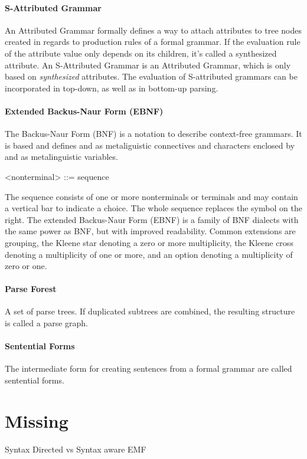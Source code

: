 \paragraph{S-Attributed Grammar} 
An Attributed Grammar formally defines a way to attach attributes to tree nodes created in regards to production rules of a formal grammar. If  the evaluation rule of the attribute value only depends on its children, it's called a synthesized attribute. An S-Attributed Grammar is an Attributed Grammar, which is only based on \emph{synthesized} attributes. The evaluation of S-attributed grammars can be incorporated in top-down, as well as in bottom-up parsing. \cite{ParserBook}
 

\paragraph{Extended Backus-Naur Form (EBNF)} 
The Backus-Naur Form (BNF) is a notation to describe context-free grammars. It is based \cite{BNF} and defines \code{:=} and \code{|} as metaliguistic connectives and characters enclosed by \code{<} and \code{>} as metalinguistic variables.
\begin{xtxt}
 <nonterminal> ::= sequence
\end{xtxt}
The sequence consists of one or more nonterminals or terminals and may contain a vertical bar to indicate a choice. The whole sequence replaces the symbol on the right. The extended Backus-Naur Form (EBNF) is a family of BNF dialects with the same power as BNF, but with improved readability. Common extensions are grouping, the Kleene star denoting a zero or more multiplicity, the Kleene cross denoting a multiplicity of one or more, and an option denoting a multiplicity of zero or one. \cite{ParserBook}

\paragraph{Parse Forest} 
A set of parse trees. If duplicated subtrees are combined, the resulting structure is called a parse graph. \cite{ParserBook}

\paragraph{Sentential Forms}   
The intermediate form for creating sentences from a formal grammar are called sentential forms. \cite{ParserBook}



\section{Missing}
Syntax Directed vs Syntax aware
EMF

